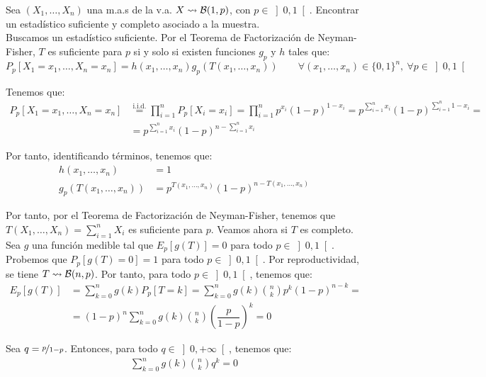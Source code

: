 \begin{ejemplo}\label{ejemplo:suficiencia-completitud-Bernoulli}
    Sea $(X_1, \ldots, X_n)$ una m.a.s de la v.a. $X \rightsquigarrow \mathcal{B}(1, p)$, con $p \in \left]0, 1\right[$. Encontrar un estadístico suficiente y completo asociado a la muestra.\\

    Buscamos un estadístico suficiente. Por el Teorema de Factorización de Neyman-Fisher, $T$ es suficiente para $p$ si y solo si existen funciones $g_p$ y $h$ tales que:
    \begin{equation*}
        P_p[X_1=x_1, \ldots, X_n=x_n] = h(x_1, \ldots, x_n) g_p(T(x_1, \ldots, x_n)) \qquad \forall (x_1, \ldots, x_n)\in\{0, 1\}^n,\ \forall p\in\left]0, 1\right[
    \end{equation*}

    Tenemos que:
    \begin{align*}
        P_p[X_1=x_1, \ldots, X_n=x_n] &\stackrel{\text{i.i.d.}}{=} \prod_{i=1}^n P_p[X_i=x_i] = \prod_{i=1}^n p^{x_i}(1-p)^{1-x_i} = p^{\sum\limits_{i=1}^n x_i}(1-p)^{\sum\limits_{i=1}^n 1-x_i} =\\&= p^{\sum\limits_{i=1}^n x_i}(1-p)^{n-\sum\limits_{i=1}^n x_i}
    \end{align*}

    Por tanto, identificando términos, tenemos que:
    \begin{align*}
        h(x_1, \ldots, x_n) &= 1 \\
        g_p(T(x_1, \ldots, x_n)) &= p^{T(x_1, \ldots, x_n)}(1-p)^{n-T(x_1, \ldots, x_n)}
    \end{align*}

    Por tanto, por el Teorema de Factorización de Neyman-Fisher, tenemos que $T(X_1, \ldots, X_n) = \sum\limits_{i=1}^n X_i$ es suficiente para $p$. Veamos ahora si $T$ es completo. Sea $g$ una función medible tal que $E_p[g(T)] = 0$ para todo $p\in\left]0, 1\right[$. Probemos que $P_p[g(T)=0] = 1$ para todo $p\in\left]0, 1\right[$. Por reproductividad, se tiene $T \rightsquigarrow \mathcal{B}(n, p)$. Por tanto, para todo $p\in\left]0, 1\right[$, tenemos que:
    \begin{align*}
        E_p[g(T)] &= \sum\limits_{k=0}^n g(k) P_p[T=k] = \sum\limits_{k=0}^n g(k) \binom{n}{k} p^k (1-p)^{n-k}
        =\\&= (1-p)^n \sum\limits_{k=0}^n g(k) \binom{n}{k} \left(\dfrac{p}{1-p}\right)^k = 0
    \end{align*}

    Sea $q = \nicefrac{p}{1-p}$. Entonces, para todo $q\in\left]0, +\infty\right[$, tenemos que:
    \begin{align*}
        \sum\limits_{k=0}^n g(k) \binom{n}{k} q^k = 0
    \end{align*}


\end{ejemplo}
